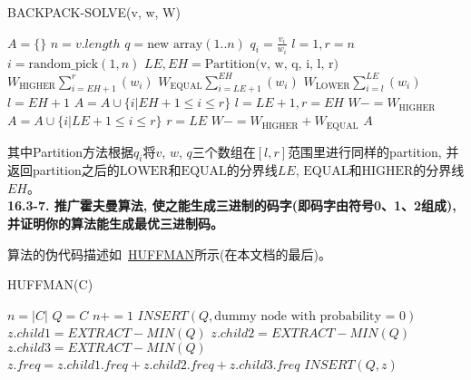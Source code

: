 \documentclass[paper=a4, fontsize=11pt]{scrartcl} %
\numberwithin{equation}{section} %
\numberwithin{figure}{section} %
\numberwithin{table}{section} %
\begin{document}
\begin{algorithm}[ht]
  \caption{BACKPACK-SOLVE(v, w, W)}
  \label{algo:backpack}
  \begin{algorithmic}[1]
    \State $A = \{\}$
    \State $n = v.length$
    \State $q = \mbox{new array}(1..n)$
    \State $q_i = \frac{v_i}{w_i}$
    \EndFor
    \State $l = 1, r = n$
    \State $i = \mbox{random\_pick}(1, n)$
    \State $LE, EH = \mbox{Partition(v, w, q, i, l, r)}$ 
    \State $W_{\mbox{HIGHER}}\sum_{i=EH+1}^{r}(w_i)$
    \State $W_{\mbox{EQUAL}}\sum_{i=LE+1}^{EH}(w_i)$
    \State $W_{\mbox{LOWER}}\sum_{i=l}^{LE}(w_i)$
    \State $l = EH + 1$
    \State $A = A \cup \{i | EH + 1 \leq i \leq r\}$
    \State $l = LE + 1, r = EH$
    \State $W -= W_{\mbox{HIGHER}}$
    \Else
    \State $A = A \cup \{i | LE + 1 \leq i \leq r\}$
    \State $r = LE$
    \State $W -= W_{\mbox{HIGHER}} + W_{\mbox{EQUAL}}$
    \EndIf
    \EndWhile
    \State\Return $A$
  \end{algorithmic}
\end{algorithm}

其中Partition方法根据$q_i$将$v$, $w$, $q$三个数组在$[l, r]$范围里进行同样的partition, 并返回partition之后的$\mbox{LOWER}$和$\mbox{EQUAL}$的分界线$LE$, $\mbox{EQUAL}$和$\mbox{HIGHER}$的分界线$EH$。
\\[4ex]

\textbf{16.3-7. 推广霍夫曼算法, 使之能生成三进制的码字(即码字由符号0、1、2组成), 并证明你的算法能生成最优三进制码。}

算法的伪代码描述如~\hyperref[algo:huffman]{HUFFMAN}所示(在本文档的最后)。
\begin{algorithm}[ht]
  \caption{HUFFMAN(C)}
  \label{algo:huffman}
  \begin{algorithmic}[1]
    \State $n = |C|$
    \State $Q = C$
    \State $n += 1$
    \State $INSERT(Q, \mbox{dummy node with probability = 0})$
    \EndIf
    \State $z.child1 = EXTRACT-MIN(Q)$
    \State $z.child2 =  EXTRACT-MIN(Q)$
    \State $z.child3 = EXTRACT-MIN(Q)$
    \State $z.freq = z.child1.freq + z.child2.freq + z.child3.freq$
    \State $INSERT(Q, z)$
    \EndWhile
  \end{algorithmic}
\end{algorithm}
\end{document}
